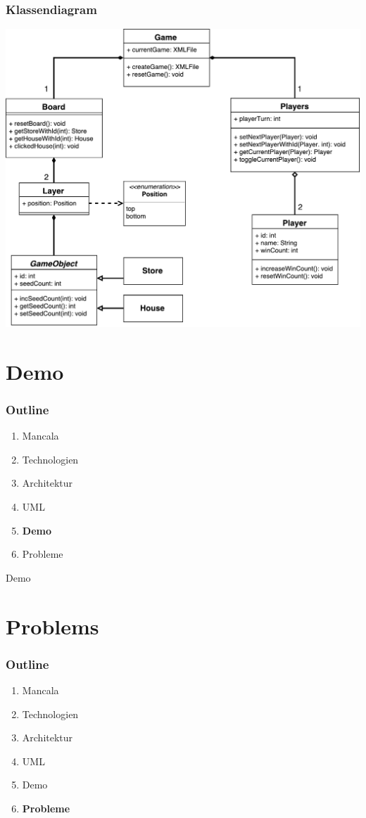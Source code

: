 \documentclass[
	10pt,
	t		%
]{beamer}
\begin{document}
\begin{frame}
\frametitle{Klassendiagram}
\begin{center}
\includegraphics[scale=0.32]{./../Diagrams/Classes.pdf}
\end{center}
\end{frame}

\section{Demo}
\begin{frame}
\frametitle{Outline}
\begin{enumerate}
\item Mancala
\item Technologien
\item Architektur
\item UML
\item \textbf{Demo}
\item Probleme
\end{enumerate}
\end{frame}

\begin{frame}[plain, c]
\begin{center}
\Large Demo
\end{center}
\end{frame}

\section{Problems}
\begin{frame}
\frametitle{Outline}
\begin{enumerate}
\item Mancala
\item Technologien
\item Architektur
\item UML
\item Demo
\item \textbf{Probleme}
\end{enumerate}
\end{frame}
\end{document}
